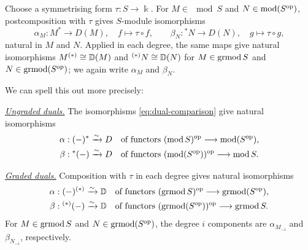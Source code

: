 \begin{advanced}[suppressfirstparskip=true,innertopmargin=0pt]
\begin{theorem}\label{prop:dual-comparison}\label{cor:graded-dual-comparison}
Choose a symmetrising form $\tau:S\to\Bbbk$.
For $M\in\mod S$ and $N\in\operatorname{\mathrm{mod}}(S^{\mathrm{op}})$, postcomposition with $\tau$ gives $S$-module isomorphisms
\begin{equation}\label{eq:dual-comparison}
\alpha_M:M^*\longrightarrow D(M),\quad f\longmapsto\tau\circ f,
\qquad
\beta_N:{}^*N\longrightarrow D(N),\quad g\longmapsto\tau\circ g,
\end{equation}
natural in $M$ and $N$.
Applied in each degree, the same maps give natural isomorphisms $M^{(*)}\cong\mathbb{D}(M)$ and ${}^{(*)}N\cong\mathbb{D}(N)$ for $M\in\operatorname{\mathrm{grmod}} S$ and $N\in\operatorname{\mathrm{grmod}}(S^{\mathrm{op}})$; we again write $\alpha_M$ and $\beta_N$.
\end{theorem}

We can spell this out more precisely:


\underline{\emph{Ungraded duals.}}
The isomorphisms \eqref{eq:dual-comparison} give natural isomorphisms
\begin{equation}\label{eq:dual-comparison-functors}
\begin{aligned}
\alpha:(-)^*&\xrightarrow{\sim}D
&&\text{of functors }(\operatorname{\mathrm{mod}} S)^{\mathrm{op}}\longrightarrow\operatorname{\mathrm{mod}}(S^{\mathrm{op}}),\\
\beta:{}^*(-)&\xrightarrow{\sim}D
&&\text{of functors }(\operatorname{\mathrm{mod}}(S^{\mathrm{op}}))^{\mathrm{op}}\longrightarrow\operatorname{\mathrm{mod}} S.
\end{aligned}
\end{equation}

\underline{\emph{Graded duals.}}
Composition with $\tau$ in each degree gives natural isomorphisms
\begin{equation}\label{eq:graded-dual-comparison}
\begin{aligned}
\alpha:(-)^{(*)}&\xrightarrow{\sim}\mathbb{D}
&&\text{of functors }(\operatorname{\mathrm{grmod}} S)^{\mathrm{op}}\longrightarrow\operatorname{\mathrm{grmod}}(S^{\mathrm{op}}),\\
\beta:{}^{(*)}(-)&\xrightarrow{\sim}\mathbb{D}
&&\text{of functors }(\operatorname{\mathrm{grmod}}(S^{\mathrm{op}}))^{\mathrm{op}}\longrightarrow\operatorname{\mathrm{grmod}} S.
\end{aligned}
\end{equation}
For $M\in\operatorname{\mathrm{grmod}} S$ and $N\in\operatorname{\mathrm{grmod}}(S^{\mathrm{op}})$, the degree $i$ components are $\alpha_{M_{-i}}$ and $\beta_{N_{-i}}$, respectively.


\end{advanced}
